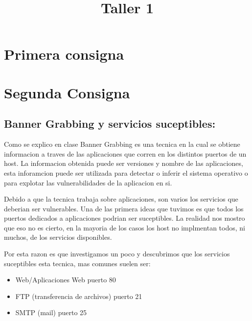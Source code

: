 \documentclass[a4paper]{article}
\title{Taller 1}
\begin{document}


\maketitle

\newpage




\newpage


\section{Primera consigna}


\section{Segunda Consigna}

\subsection{Banner Grabbing y servicios suceptibles:}
Como se explico en clase  Banner Grabbing es una tecnica en la cual se obtiene informacion a traves de las aplicaciones que corren en los distintos puertos de un host. La informacion obtenida puede ser
versiones y nombre de las aplicaciones, esta inforamcion puede ser utilizada para detectar o inferir el sistema operativo o para explotar las vulnerabilidades de la aplicacion en si.

Debido a que la tecnica trabaja sobre aplicaciones, son varios los servicios que deberian ser vulnerables. Una de las primera ideas que tuvimos es que todos los puertos dedicados a aplicaciones
podrian ser suceptibles. La realidad nos mostro que eso no es cierto, en la mayoria de los casos los host no implmentan todos, ni muchos, de los servicios disponibles. 

Por esta razon es que investigamos un poco y descubrimos que  los servicios suceptibles esta tecnica, mas comunes suelen ser:
\begin{itemize}
\item Web/Aplicaciones Web puerto 80
\item FTP (transferencia de archivos) puerto 21
\item SMTP (mail) puerto 25
\end{itemize}
\end{document}
